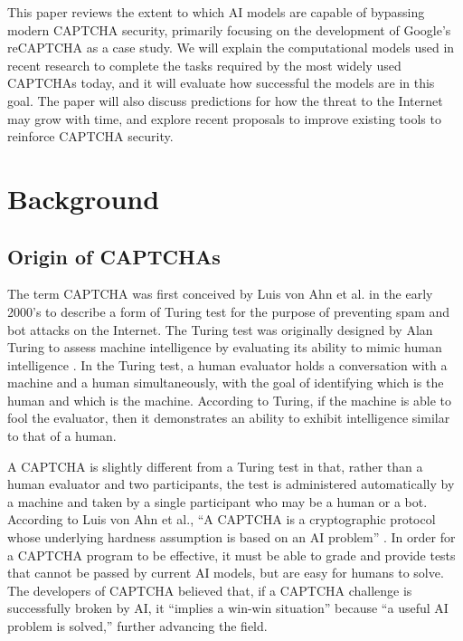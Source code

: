 \documentclass[sigplan,screen,nonacm]{acmart-tagged}
\begin{document}
This paper reviews the extent to which AI models are capable of bypassing modern CAPTCHA security, primarily focusing on the development of Google's reCAPTCHA as a case study. We will explain the computational models used in recent research to complete the tasks required by the most widely used CAPTCHAs today, and it will evaluate how successful the models are in this goal. The paper will also discuss predictions for how the threat to the Internet may grow with time, and explore recent proposals to improve existing tools to reinforce CAPTCHA security.
 

\section{Background}
\label{background}

\subsection{Origin of CAPTCHAs}
\label{sec:background-captcha}

The term CAPTCHA was first conceived by Luis von Ahn et al. \cite{captcha} in the early 2000's to describe a form of Turing test for the purpose of preventing spam and bot attacks on the Internet. The Turing test was originally designed by Alan Turing to assess machine intelligence by evaluating its ability to mimic human intelligence \cite{turing}. In the Turing test, a human evaluator holds a conversation with a machine and a human simultaneously, with the goal of identifying which is the human and which is the machine. According to Turing, if the machine is able to fool the evaluator, then it demonstrates an ability to exhibit intelligence similar to that of a human.

A CAPTCHA is slightly different from a Turing test in that, rather than a human evaluator and two participants, the test is administered automatically by a machine and taken by a single participant who may be a human or a bot. According to Luis von Ahn et al., ``A CAPTCHA is a cryptographic protocol whose underlying hardness assumption is based on an AI problem'' \cite{captcha}. In order for a CAPTCHA program to be effective, it must be able to grade and provide tests that cannot be passed by current AI models, but are easy for humans to solve. The developers of CAPTCHA believed that, if a CAPTCHA challenge is successfully broken by AI, it ``implies a win-win situation'' because ``a useful AI problem is solved,'' further advancing the field.
\end{document}
